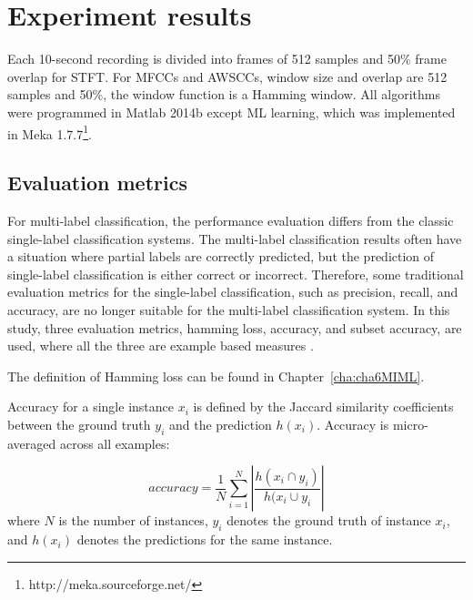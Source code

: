 \section{Experiment results}
Each 10-second recording is divided into frames of 512 samples and 50\% frame overlap for STFT. For MFCCs and AWSCCs, window size and overlap are 512 samples and 50\%, the window function is a Hamming window. All algorithms were programmed in Matlab 2014b except ML learning, which was implemented in Meka 1.7.7\footnote[4]{http://meka.sourceforge.net/}. 







\subsection{Evaluation metrics}
For multi-label classification, the performance evaluation differs from the classic single-label classification systems. The multi-label classification results often have a situation where partial labels are correctly predicted, but the prediction of single-label classification is either correct or incorrect. Therefore, some traditional evaluation metrics for the single-label classification, such as precision, recall, and accuracy, are no longer suitable for the multi-label classification system. In this study, three evaluation metrics, hamming loss, accuracy, and subset accuracy, are used, where all the three are example based measures \citep{madjarov2012extensive}.


The definition of Hamming loss can be found in Chapter~\ref{cha:cha6MIML}.

Accuracy for a single instance $x_{i}$ is defined by the Jaccard similarity coefficients between the ground truth $y_{i}$ and the prediction $h(x_{i})$. Accuracy is micro-averaged across all examples:

\begin{equation}
accuracy = \frac{1}{N}\sum_{i=1}^{N}|\frac{h(x_{i} \cap y_{i})}{h(x_{i} \cup y_{i}}|
\end{equation}
where $N$ is the number of instances, $y_{i}$ denotes the ground truth of instance $x_{i}$, and $h(x_{i})$ denotes the predictions for the same instance. 


